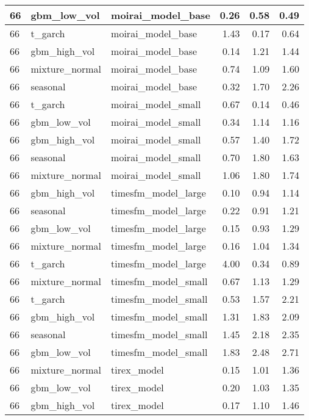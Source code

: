 {\begin{tabular}{lllrrr}
\midrule
66 & gbm\_low\_vol & moirai\_model\_base & 0.26 & 0.58 & 0.49 \\
\midrule
66 & t\_garch & moirai\_model\_base & 1.43 & 0.17 & 0.64 \\
\midrule
66 & gbm\_high\_vol & moirai\_model\_base & 0.14 & 1.21 & 1.44 \\
\midrule
66 & mixture\_normal & moirai\_model\_base & 0.74 & 1.09 & 1.60 \\
\midrule
66 & seasonal & moirai\_model\_base & 0.32 & 1.70 & 2.26 \\
\midrule
66 & t\_garch & moirai\_model\_small & 0.67 & 0.14 & 0.46 \\
\midrule
66 & gbm\_low\_vol & moirai\_model\_small & 0.34 & 1.14 & 1.16 \\
\midrule
66 & gbm\_high\_vol & moirai\_model\_small & 0.57 & 1.40 & 1.72 \\
\midrule
66 & seasonal & moirai\_model\_small & 0.70 & 1.80 & 1.63 \\
\midrule
66 & mixture\_normal & moirai\_model\_small & 1.06 & 1.80 & 1.74 \\
\midrule
66 & gbm\_high\_vol & timesfm\_model\_large & 0.10 & 0.94 & 1.14 \\
\midrule
66 & seasonal & timesfm\_model\_large & 0.22 & 0.91 & 1.21 \\
\midrule
66 & gbm\_low\_vol & timesfm\_model\_large & 0.15 & 0.93 & 1.29 \\
\midrule
66 & mixture\_normal & timesfm\_model\_large & 0.16 & 1.04 & 1.34 \\
\midrule
66 & t\_garch & timesfm\_model\_large & 4.00 & 0.34 & 0.89 \\
\midrule
66 & mixture\_normal & timesfm\_model\_small & 0.67 & 1.13 & 1.29 \\
\midrule
66 & t\_garch & timesfm\_model\_small & 0.53 & 1.57 & 2.21 \\
\midrule
66 & gbm\_high\_vol & timesfm\_model\_small & 1.31 & 1.83 & 2.09 \\
\midrule
66 & seasonal & timesfm\_model\_small & 1.45 & 2.18 & 2.35 \\
\midrule
66 & gbm\_low\_vol & timesfm\_model\_small & 1.83 & 2.48 & 2.71 \\
\midrule
66 & mixture\_normal & tirex\_model & 0.15 & 1.01 & 1.36 \\
\midrule
66 & gbm\_low\_vol & tirex\_model & 0.20 & 1.03 & 1.35 \\
\midrule
66 & gbm\_high\_vol & tirex\_model & 0.17 & 1.10 & 1.46 \\

\end{tabular}}
